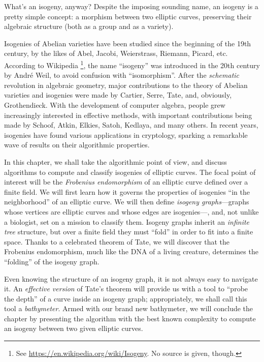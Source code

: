 \documentclass{report}
\theoremstyle{plain}
\theoremstyle{definition}
\begin{document}
What's an isogeny, anyway? %
Despite the imposing sounding name, an isogeny is a pretty simple
concept: a morphism between two elliptic curves, preserving their
algebraic structure (both as a group and as a variety). %

Isogenies of Abelian varieties have been studied since the beginning
of the 19th century, by the likes of Abel, Jacobi, Weierstrass,
Riemann, Picard, etc. %
According to Wikipedia%
\footnote{See \url{https://en.wikipedia.org/wiki/Isogeny}. No source
  is given, though.}, %
the name ``isogeny'' was introduced in the 20th century by André Weil,
to avoid confusion with ``isomorphism''. %
After the \emph{schematic} revolution in algebraic geometry, major
contributions to the theory of Abelian varieties and isogenies were
made by Cartier, Serre, Tate, and, obviously, Grothendieck. %
With the development of computer algebra, people grew increasingly
interested in effective methods, with important contributions being
made by Schoof, Atkin, Elkies, Satoh, Kedlaya, and many others. %
In recent years, isogenies have found various applications in
cryptology, sparking a remarkable wave of results on their algorithmic
properties. %

In this chapter, we shall take the algorithmic point of view, and
discuss algorithms to compute and classify isogenies of elliptic
curves. %
The focal point of interest will be the \emph{Frobenius endomorphism}
of an elliptic curve defined over a finite field. %
We will first learn how it governs the properties of isogenies ``in
the neighborhood'' of an elliptic curve. %
We will then define \emph{isogeny graphs}---graphs whose vertices are
elliptic curves and whose edges are isogenies---, and, not unlike a
biologist, set on a mission to classify them. %
Isogeny graphs inherit an \emph{infinite tree} structure, but over a
finite field they must ``fold'' in order to fit into a finite space. %
Thanks to a celebrated theorem of Tate, we will discover that the
Frobenius endomorphism, much like the DNA of a living creature,
determines the ``folding'' of the isogeny graph. %

Even knowing the structure of an isogeny graph, it is not always easy
to navigate it. %
An \emph{effective version} of Tate's theorem will provide us with a
tool to ``probe the depth'' of a curve inside an isogeny graph;
appropriately, we shall call this tool a \emph{bathymeter}. %
Armed with our brand new bathymeter, we will conclude the chapter by
presenting the algorithm with the best known complexity to compute an
isogeny between two given elliptic curves. %
\end{document}
